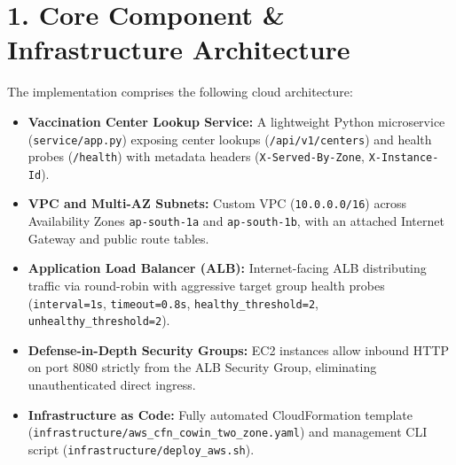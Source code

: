 \documentclass[11pt,a4paper]{article}
\newcommand{\sectionline}[1]{\section*{\color{navy}#1}}
\begin{document}
\sectionline{1. Core Component \& Infrastructure Architecture}
The implementation comprises the following cloud architecture:
\begin{itemize}
    \item \textbf{Vaccination Center Lookup Service:} A lightweight Python microservice (\texttt{service/app.py}) exposing center lookups (\texttt{/api/v1/centers}) and health probes (\texttt{/health}) with metadata headers (\texttt{X-Served-By-Zone}, \texttt{X-Instance-Id}).
    \item \textbf{VPC and Multi-AZ Subnets:} Custom VPC (\texttt{10.0.0.0/16}) across Availability Zones \texttt{ap-south-1a} and \texttt{ap-south-1b}, with an attached Internet Gateway and public route tables.
    \item \textbf{Application Load Balancer (ALB):} Internet-facing ALB distributing traffic via round-robin with aggressive target group health probes (\texttt{interval=1s}, \texttt{timeout=0.8s}, \texttt{healthy\_threshold=2}, \texttt{unhealthy\_threshold=2}).
    \item \textbf{Defense-in-Depth Security Groups:} EC2 instances allow inbound HTTP on port 8080 strictly from the ALB Security Group, eliminating unauthenticated direct ingress.
    \item \textbf{Infrastructure as Code:} Fully automated CloudFormation template (\texttt{infrastructure/aws\_cfn\_cowin\_two\_zone.yaml}) and management CLI script (\texttt{infrastructure/deploy\_aws.sh}).
\end{itemize}

\begin{center}
\end{center}
\end{document}
